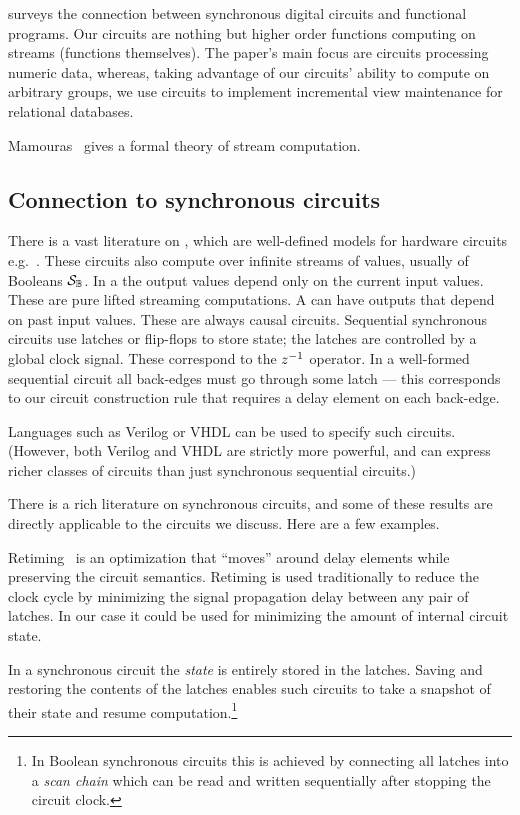 \cite{gammie-acs13} surveys the connection between synchronous digital
circuits and functional programs.  Our circuits are nothing but higher
order functions computing on streams (functions themselves).  The
paper's main focus are circuits processing numeric data, whereas,
taking advantage of our circuits' ability to compute on arbitrary
groups, we use circuits to implement incremental view maintenance for
relational databases.

Mamouras~\cite{mamouras-esop20} gives a formal theory of stream computation.

\subsection{Connection to synchronous circuits}

There is a vast literature on , which
are well-defined models for hardware circuits
e.g.~\cite{gammie-acs13}.  These circuits also compute over infinite
streams of values, usually of Booleans $\mathcal{S}_{\mathbb{B}}$.  In a
 the output values depend only on the
current input values.  These are pure lifted streaming computations.
A  can have outputs that depend on past
input values.  These are always causal circuits.  Sequential
synchronous circuits use latches or flip-flops to store state; the
latches are controlled by a global clock signal.  These correspond to
the $z^{-1}$ operator.  In a well-formed sequential circuit all
back-edges must go through some latch --- this corresponds to our
circuit construction rule that requires a delay element on each
back-edge.

Languages such as Verilog or VHDL can be used to specify such
circuits.  (However, both Verilog and VHDL are strictly more powerful,
and can express richer classes of circuits than just synchronous
sequential circuits.)

There is a rich literature on synchronous circuits, and some of these
results are directly applicable to the circuits we discuss.  Here are
a few examples.

Retiming~\cite{leiserson-algorithmica91} is an optimization that
``moves'' around delay elements while preserving the circuit
semantics.  Retiming is used traditionally to reduce the clock cycle
by minimizing the signal propagation delay between any pair of
latches.  In our case it could be used for minimizing the amount of
internal circuit state.

In a synchronous circuit the \emph{state} is entirely stored in the
latches.  Saving and restoring the contents of the latches enables
such circuits to take a snapshot of their state and resume
computation.\footnote{In Boolean synchronous circuits this is achieved
  by connecting all latches into a \emph{scan chain} which can be read
  and written sequentially after stopping the circuit clock.}

